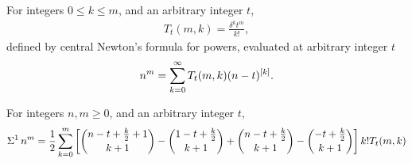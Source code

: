 \begin{definition}
  For integers $0 \leq k \leq m$, and an arbitrary integer $t$,
  \begin{align*}
    T_t (m,k) = \frac{\delta^{k} t^m}{k!},
  \end{align*}
  defined by central Newton's formula for powers,
  evaluated at arbitrary integer
  $t$
  \begin{align*}
    n^m = \sum_{k=0}^{\infty} T_t(m,k) (n-t)^{[k]}.
  \end{align*}
\end{definition}

\begin{proposition}
  \label{prop:generalized-central-factorial-sums}
  For integers $n,m \geq 0$, and an arbitrary integer $t$,
  \begin{align*}
    \Sigma^{1}\,{n}^{m} = \frac{1}{2} \sum_{k=0}^{m}
    \left[
      \binom{n -t + \frac{k}{2} +1}{k+1} - \binom{1 -t + \tfrac{k}{2}}{k+1}
      + \binom{n -t + \frac{k}{2}}{k+1} - \binom{-t + \tfrac{k}{2}}{k+1}
    \right] k! T_t (m,k)
  \end{align*}
\end{proposition}








